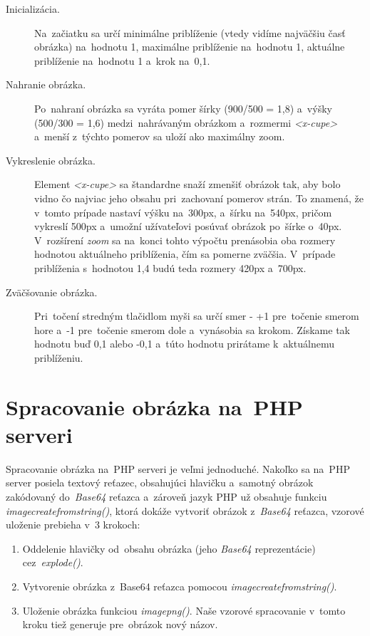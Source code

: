 \begin{description}
	\item[Inicializácia.] Na~začiatku sa určí minimálne priblíženie (vtedy vidíme najväčšiu časť obrázka) na~hodnotu 1, maximálne priblíženie na~hodnotu 1, aktuálne priblíženie na~hodnotu 1 a~krok na~0,1.

	\item[Nahranie obrázka.] Po~nahraní obrázka sa vyráta pomer šírky (900/500 = 1,8) a~výšky (500/300 = 1,6) medzi~nahrávaným obrázkom a~rozmermi \emph{<x-cupe>} a~menší z~týchto pomerov sa uloží ako maximálny zoom.

	\item[Vykreslenie obrázka.] Element \emph{<x-cupe>} sa štandardne snaží zmenšiť obrázok tak, aby bolo vidno čo najviac jeho obsahu pri~zachovaní pomerov strán. To znamená, že v~tomto prípade nastaví výšku na~300px, a~šírku na~540px, pričom vykreslí 500px a~umožní užívateľovi posúvať obrázok po~šírke o~40px. V~rozšírení \emph{zoom} sa na~konci tohto výpočtu prenásobia oba rozmery hodnotou aktuálneho priblíženia, čím sa pomerne zväčšia. V~prípade priblíženia s~hodnotou 1,4 budú teda rozmery 420px a~700px.

	\item[Zväčšovanie obrázka.] Pri~točení stredným tlačidlom myši sa určí smer - +1 pre~točenie smerom hore a~-1 pre~točenie smerom dole a~vynásobia sa krokom. Získame tak hodnotu buď 0,1 alebo -0,1 a~túto hodnotu prirátame k~aktuálnemu priblíženiu.
\end{description}


\section{Spracovanie obrázka na~PHP serveri}

Spracovanie obrázka na~PHP serveri je veľmi jednoduché. Nakoľko sa na~PHP server posiela textový reťazec, obsahujúci hlavičku a~samotný obrázok zakódovaný do~\emph{Base64} reťazca a~zároveň jazyk PHP už obsahuje funkciu \emph{imagecreatefromstring()}, ktorá dokáže vytvoriť obrázok z~\emph{Base64} reťazca, vzorové uloženie prebieha v~3 krokoch:

\begin{enumerate}
	\item Oddelenie hlavičky od~obsahu obrázka (jeho \emph{Base64} reprezentácie) cez~\emph{explode()}.
	\item Vytvorenie obrázka z~Base64 reťazca pomocou \emph{imagecreatefromstring()}.
	\item Uloženie obrázka funkciou \emph{imagepng()}. Naše vzorové spracovanie v~tomto kroku tiež generuje pre~obrázok nový názov.
\end{enumerate}

